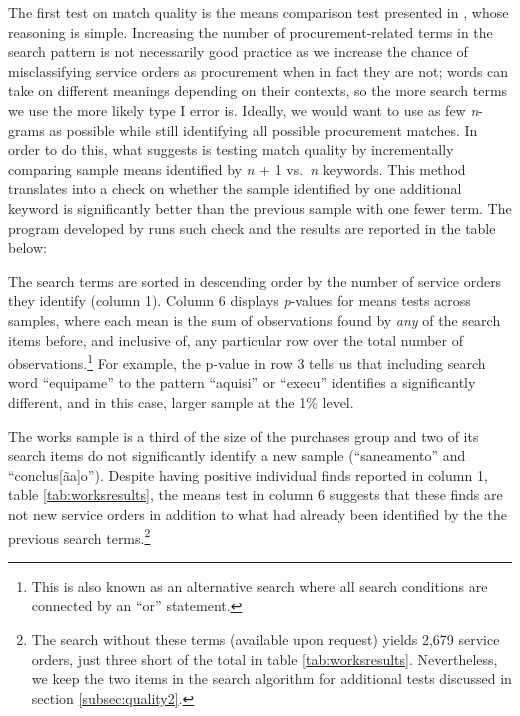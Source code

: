 \documentclass[11pt]{article}
\begin{document}
The first test on match quality is the means comparison test presented in \citet{AssumpcaotextfindDataDrivenText2018}, whose reasoning is simple. Increasing the number of procurement-related terms in the search pattern is not necessarily good practice as we increase the chance of misclassifying service orders as procurement when in fact they are not; words can take on different meanings depending on their contexts, so the more search terms we use the more likely type I error is. Ideally, we would want to use as few \emph{n}-grams as possible while still identifying all possible procurement matches. In order to do this, what \citet{AssumpcaotextfindDataDrivenText2018} suggests is testing match quality by incrementally comparing sample means identified by \emph{n} + 1 vs.~\emph{n} keywords. This method translates into a check on whether the sample identified by one additional keyword is significantly better than the previous sample with one fewer term. The program developed by \citet{AssumpcaotextfindDataDrivenText2018} runs such check and the results are reported in the table below:



The search terms are sorted in descending order by the number of service orders they identify (column 1). Column 6 displays \emph{p}-values for means tests across samples, where each mean is the sum of observations found by \emph{any} of the search items before, and inclusive of, any particular row over the total number of observations.\footnote{This is also known as an alternative search where all search conditions are connected by an ``or'' statement.} For example, the p-value in row 3 tells us that including search word ``equipame'' to the pattern ``aquisi'' or ``execu'' identifies a significantly different, and in this case, larger sample at the 1\% level.
\vspace{0pt}


The works sample is a third of the size of the purchases group and two of its search items do not significantly identify a new sample (``saneamento'' and ``conclus{[}ãa{]}o''). Despite having positive individual finds reported in column 1, table \ref{tab:worksresults}, the means test in column 6 suggests that these finds are not new service orders in addition to what had already been identified by the the previous search terms.\footnote{The search without these terms (available upon request) yields 2,679 service orders, just three short of the total in table \ref{tab:worksresults}. Nevertheless, we keep the two items in the search algorithm for additional tests discussed in section \ref{subsec:quality2}.}
\end{document}
